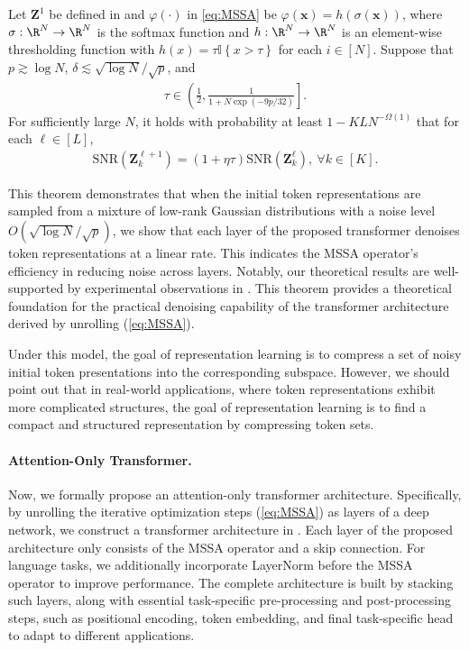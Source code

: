 \documentclass[../../book-main.tex]{subfiles}
\begin{document}
\begin{theorem}\label{thm:1}
Let $\bm Z^{1}$ be defined in  and $\varphi(\cdot)$ in \eqref{eq:MSSA} be 
$\varphi(\bm x) = h\left(\sigma(\bm x)\right)$,
where $\sigma:\R^N \to \R^N$ is the softmax function and $h:\R^N \to \R^N$ is an element-wise thresholding function with $h(x) = \tau \mathbb{I}\left\{x > \tau\right\}$ for each $i \in [N]$. Suppose that $p \gtrsim \log N$, $\delta \lesssim \sqrt{\log N}/\sqrt{p}$, and 
\begin{align*}
\tau \in \left( \frac{1}{2},  \frac{1}{1+N\exp(-9p/32)} \right].
\end{align*}
For sufficiently large $N$, it holds with probability at least $1-KLN^{-\Omega(1)}$ that for each $\ell \in [L]$, 
    \begin{align}\label{eq:SNR}
        \mathrm{SNR}(\bm Z_k^{\ell+1}) = (1+\eta\tau) \mathrm{SNR}(\bm Z_k^{\ell}),\ \forall k \in [K]. 
    \end{align}
\end{theorem}
This theorem demonstrates that when the initial token representations are sampled from a mixture of low-rank Gaussian distributions with a noise level $O(\sqrt{\log N}/\sqrt{p})$, we show that each layer of the proposed transformer denoises token representations at a linear rate. This indicates the MSSA operator's efficiency in reducing noise across layers. Notably, our theoretical results are well-supported by experimental observations in . This theorem provides a theoretical foundation for the practical denoising capability of the transformer architecture derived by unrolling (\ref{eq:MSSA}). 

\begin{remark}
    Under this model, the goal of representation learning is to compress a set of noisy initial token presentations into the corresponding subspace. However, we should point out that in real-world applications, where token representations exhibit more complicated structures, the goal of representation learning is to find a compact and structured representation by compressing token sets. 
\end{remark}


\paragraph{Attention-Only Transformer.} Now, we formally propose an attention-only transformer architecture. Specifically, by unrolling the iterative optimization steps (\ref{eq:MSSA}) as layers of a deep network, we construct a transformer architecture in . Each layer of the proposed architecture only consists of the MSSA operator and a skip connection. For language tasks, we additionally incorporate LayerNorm before the MSSA operator to improve performance. The complete architecture is built by stacking such layers, along with essential task-specific pre-processing and post-processing steps, such as positional encoding, token embedding, and final task-specific head to adapt to different applications. 
\end{document}
